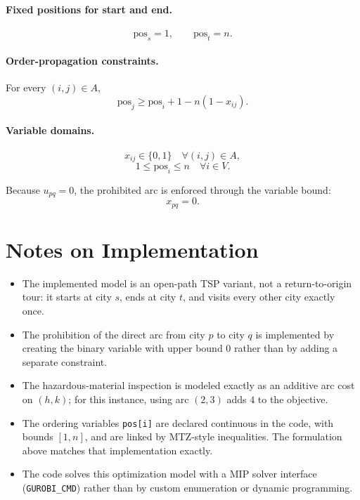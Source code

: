 \paragraph{Fixed positions for start and end.}
\[
\mathrm{pos}_s = 1,
\qquad
\mathrm{pos}_t = n.
\]

\paragraph{Order-propagation constraints.}
For every $(i,j)\in A$,
\[
\mathrm{pos}_j \ge \mathrm{pos}_i + 1 - n(1-x_{ij}).
\]

\paragraph{Variable domains.}
\[
x_{ij}\in\{0,1\}\quad \forall (i,j)\in A,
\]
\[
1 \le \mathrm{pos}_i \le n \quad \forall i\in V.
\]

Because $u_{pq}=0$, the prohibited arc is enforced through the variable bound:
\[
x_{pq}=0.
\]

\section*{Notes on Implementation}

\begin{itemize}
\item The implemented model is an open-path TSP variant, not a return-to-origin tour: it starts at city $s$, ends at city $t$, and visits every other city exactly once.
\item The prohibition of the direct arc from city $p$ to city $q$ is implemented by creating the binary variable with upper bound $0$ rather than by adding a separate constraint.
\item The hazardous-material inspection is modeled exactly as an additive arc cost on $(h,k)$; for this instance, using arc $(2,3)$ adds $4$ to the objective.
\item The ordering variables \texttt{pos[i]} are declared continuous in the code, with bounds $[1,n]$, and are linked by MTZ-style inequalities. The formulation above matches that implementation exactly.
\item The code solves this optimization model with a MIP solver interface (\texttt{GUROBI\_CMD}) rather than by custom enumeration or dynamic programming.
\end{itemize}
